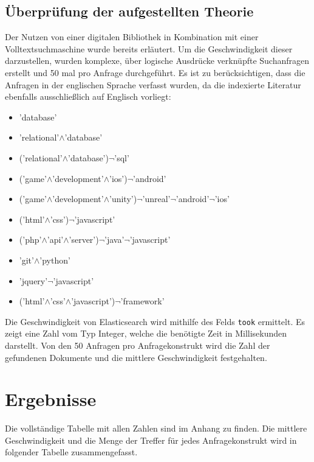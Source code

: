 \documentclass[a4paper]{scrartcl}
\begin{document}
\subsection{Überprüfung der aufgestellten Theorie}
Der Nutzen von einer digitalen Bibliothek in Kombination mit einer Volltextsuchmaschine wurde bereits erläutert. Um die Geschwindigkeit dieser darzustellen, wurden komplexe, über logische Ausdrücke verknüpfte Suchanfragen erstellt und 50 mal pro Anfrage durchgeführt. Es ist zu berücksichtigen, dass die Anfragen in der englischen Sprache verfasst wurden, da die indexierte Literatur ebenfalls ausschließlich auf Englisch vorliegt:

\begin{itemize}
	\item 'database'
	\item 'relational'$\land$'database'
	\item ('relational'$\land$'database')$\neg$'sql'
	\item ('game'$\land$'development'$\land$'ios')$\neg$'android'
	\item ('game'$\land$'development'$\land$'unity')$\neg$'unreal'$\neg$'android'$\neg$'ios'
	\item ('html'$\land$'css')$\neg$'javascript'
	\item ('php'$\land$'api'$\land$'server')$\neg$'java'$\neg$'javascript'
	\item 'git'$\land$'python'
	\item 'jquery'$\neg$'javascript'
	\item ('html'$\land$'css'$\land$'javascript')$\neg$'framework'
\end{itemize}

Die Geschwindigkeit von Elasticsearch wird mithilfe des Felds \texttt{took} ermittelt. Es zeigt eine Zahl vom Typ Integer, welche die benötigte Zeit in Millisekunden darstellt. Von den 50 Anfragen pro Anfragekonstrukt wird die Zahl der gefundenen Dokumente und die mittlere Geschwindigkeit festgehalten.

\newpage

\section{Ergebnisse}
Die vollständige Tabelle mit allen Zahlen sind im Anhang zu finden. Die mittlere Geschwindigkeit und die Menge der Treffer für jedes Anfragekonstrukt wird in folgender Tabelle zusammengefasst.
\end{document}
